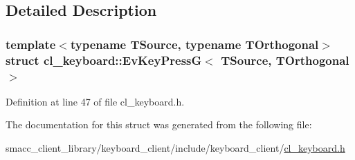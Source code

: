\subsection{Detailed Description}
\subsubsection*{template$<$typename T\+Source, typename T\+Orthogonal$>$\newline
struct cl\+\_\+keyboard\+::\+Ev\+Key\+Press\+G$<$ T\+Source, T\+Orthogonal $>$}



Definition at line 47 of file cl\+\_\+keyboard.\+h.



The documentation for this struct was generated from the following file\+:\begin{DoxyCompactItemize}
\item 
smacc\+\_\+client\+\_\+library/keyboard\+\_\+client/include/keyboard\+\_\+client/\hyperlink{cl__keyboard_8h}{cl\+\_\+keyboard.\+h}\end{DoxyCompactItemize}
